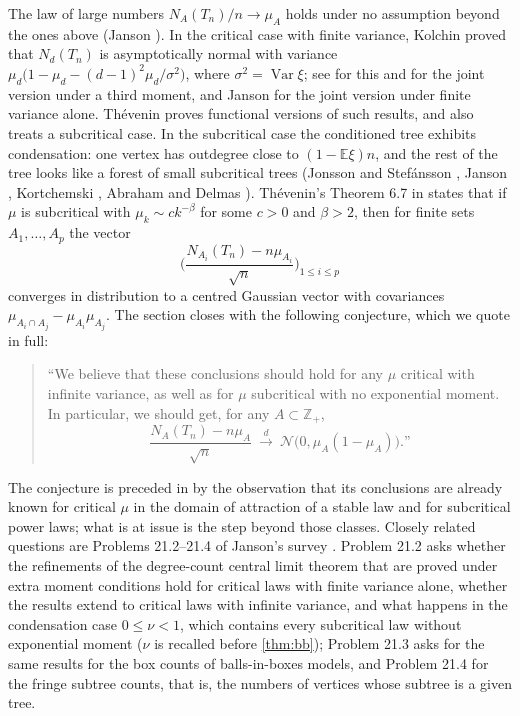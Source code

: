 \documentclass[11pt]{amsart}
\theoremstyle{definition}
\newcommand{\Z}{\mathbb{Z}}
\newcommand{\E}{\mathbb{E}}
\newcommand{\Nor}{\mathcal{N}}
\DeclareMathOperator{\Var}{Var}
\begin{document}
The law of large numbers $N_A(T_n)/n\to\mu_A$ holds under no assumption beyond the ones above (Janson \cite[Theorem 7.11]{Janson12}). In the critical case with finite variance, Kolchin \cite[Theorem 2.3.1]{Kolchin} proved that $N_d(T_n)$ is asymptotically normal with variance $\mu_d\big(1-\mu_d-(d-1)^2\mu_d/\sigma^2\big)$, where $\sigma^2=\Var\xi$; see \cite[(21.5)--(21.7)]{Janson12} for this and for the joint version under a third moment, and Janson \cite[Example 2.2]{Janson16} for the joint version under finite variance alone. Th\'evenin \cite{Thevenin} proves functional versions of such results, and also treats a subcritical case. In the subcritical case the conditioned tree exhibits condensation: one vertex has outdegree close to $(1-\E\xi)n$, and the rest of the tree looks like a forest of small subcritical trees (Jonsson and Stef\'ansson \cite{JS}, Janson \cite[Section 19]{Janson12}, Kortchemski \cite{Kortchemski}, Abraham and Delmas \cite{AD}). Th\'evenin's Theorem 6.7 in \cite{Thevenin} states that if $\mu$ is subcritical with $\mu_k\sim ck^{-\beta}$ for some $c>0$ and $\beta>2$, then for finite sets $A_1,\dots,A_p$ the vector
\[
\Big(\frac{N_{A_i}(T_n)-n\mu_{A_i}}{\sqrt n}\Big)_{1\le i\le p}
\]
converges in distribution to a centred Gaussian vector with covariances $\mu_{A_i\cap A_j}-\mu_{A_i}\mu_{A_j}$. The section closes with the following conjecture, which we quote in full:

\begin{quote}
``We believe that these conclusions should hold for any $\mu$ critical with infinite variance, as well as for $\mu$ subcritical with no exponential moment. In particular, we should get, for any $A\subset\Z_+$,
\[
\frac{N_A(T_n)-n\mu_A}{\sqrt n}\ \xrightarrow{d}\ \Nor\big(0,\mu_A(1-\mu_A)\big).\text{''}
\]
\end{quote}

The conjecture is preceded in \cite{Thevenin} by the observation that its conclusions are already known for critical $\mu$ in the domain of attraction of a stable law and for subcritical power laws; what is at issue is the step beyond those classes. Closely related questions are Problems 21.2--21.4 of Janson's survey \cite{Janson12}. Problem 21.2 asks whether the refinements of the degree-count central limit theorem that are proved under extra moment conditions hold for critical laws with finite variance alone, whether the results extend to critical laws with infinite variance, and what happens in the condensation case $0\le\nu<1$, which contains every subcritical law without exponential moment ($\nu$ is recalled before \cref{thm:bb}); Problem 21.3 asks for the same results for the box counts of balls-in-boxes models, and Problem 21.4 for the fringe subtree counts, that is, the numbers of vertices whose subtree is a given tree.
\end{document}
